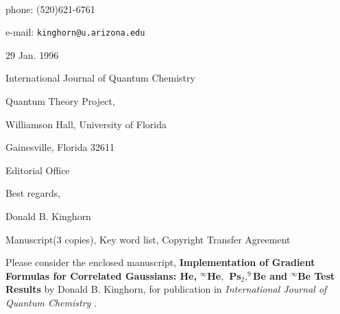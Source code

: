 \documentclass[12pt]{article}
\begin{document}
\begin{letterfrom}
\end{letterfrom}

\begin{letterfromcompany}
\end{letterfromcompany}

\begin{letterfromaddr}
\\

phone: (520)621-6761

e-mail: \texttt{kinghorn@u.arizona.edu}
\end{letterfromaddr}

\begin{letterdate}
29 Jan. 1996
\end{letterdate}

\begin{letterto}
International Journal of Quantum Chemistry
\end{letterto}

\begin{lettertoaddr}
Quantum Theory Project,

Williamson Hall, University of Florida

Gainesville, Florida 32611
\end{lettertoaddr}

\begin{letterattention}
Editorial Office
\end{letterattention}

\begin{lettersubj}
\end{lettersubj}

\begin{letterclosing}
Best regards,
\end{letterclosing}

\begin{lettersign}
Donald B. Kinghorn
\end{lettersign}

\begin{letterps}
\end{letterps}

\begin{letterinitials}
\end{letterinitials}

\begin{lettercc}
\end{lettercc}

\begin{letterencl}
Manuscript(3 copies), Key word list, Copyright Transfer Agreement
\end{letterencl}

\begin{letteropening}
\end{letteropening}

Please consider the enclosed manuscript, \textbf{Implementation of Gradient
Formulas for Correlated Gaussians: He, }$^\infty $\textbf{He},\textbf{\ Ps}$%
_2,^9$\textbf{Be and }$^\infty $\textbf{Be Test Results} by Donald B.
Kinghorn, for publication in \emph{International Journal of Quantum Chemistry%
}.
\end{document}
